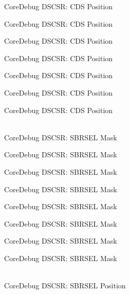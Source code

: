 \begin{DoxyRefList}
\label{deprecated__deprecated000147}%
%
Core\+Debug DSCSR:\+ CDS Position 

\label{deprecated__deprecated000223}%
%
Core\+Debug DSCSR:\+ CDS Position 

\label{deprecated__deprecated000286}%
%
Core\+Debug DSCSR:\+ CDS Position 

\label{deprecated__deprecated000365}%
%
Core\+Debug DSCSR:\+ CDS Position 

\label{deprecated__deprecated000441}%
%
Core\+Debug DSCSR:\+ CDS Position 

\label{deprecated__deprecated000544}%
%
Core\+Debug DSCSR:\+ CDS Position 

\label{deprecated__deprecated000646}%
%
Core\+Debug DSCSR:\+ CDS Position  
\item[{\parbox[t]{\linewidth}{Global \doxylink{group__CMSIS__SCB_gaaffe28a24f05446e55ba3d75bb6f4cd0}{Core\+Debug\+\_\+\+DSCSR\+\_\+\+SBRSEL\+\_\+\+Msk} }}]\hfill \\
\label{deprecated__deprecated000096}%
%
Core\+Debug DSCSR:\+ SBRSEL Mask 

\label{deprecated__deprecated000150}%
%
Core\+Debug DSCSR:\+ SBRSEL Mask 

\label{deprecated__deprecated000226}%
%
Core\+Debug DSCSR:\+ SBRSEL Mask 

\label{deprecated__deprecated000289}%
%
Core\+Debug DSCSR:\+ SBRSEL Mask 

\label{deprecated__deprecated000368}%
%
Core\+Debug DSCSR:\+ SBRSEL Mask 

\label{deprecated__deprecated000444}%
%
Core\+Debug DSCSR:\+ SBRSEL Mask 

\label{deprecated__deprecated000547}%
%
Core\+Debug DSCSR:\+ SBRSEL Mask 

\label{deprecated__deprecated000649}%
%
Core\+Debug DSCSR:\+ SBRSEL Mask  
\item[{\parbox[t]{\linewidth}{Global \doxylink{group__CMSIS__SCB_ga7450603163415ab4d4e4a7a767879eae}{Core\+Debug\+\_\+\+DSCSR\+\_\+\+SBRSEL\+\_\+\+Pos} }}]\hfill \\
\label{deprecated__deprecated000095}%
%
Core\+Debug DSCSR:\+ SBRSEL Position 


\end{DoxyRefList}

